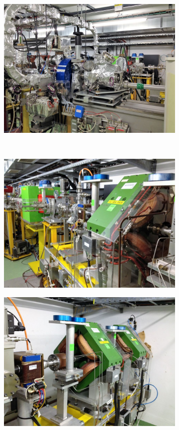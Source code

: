 \begin{figure}[h]
\begin{subfigure}{0.5\textwidth}
		\includegraphics[width=.9\linewidth]{images/CLIC-CTF3-img1.jpg}
    \end{subfigure}        
	~
    \begin{subfigure}{0.5\textwidth}
		\centering
		\includegraphics[width=.9\linewidth]{images/CLIC-CTF3-img2.jpg}
    \end{subfigure}
	\par\bigskip
    \begin{subfigure}{0.5\textwidth}
		\centering
		\includegraphics[width=.9\linewidth]{images/CLIC-CTF3-img3.jpg}

\end{subfigure}
\end{figure}

